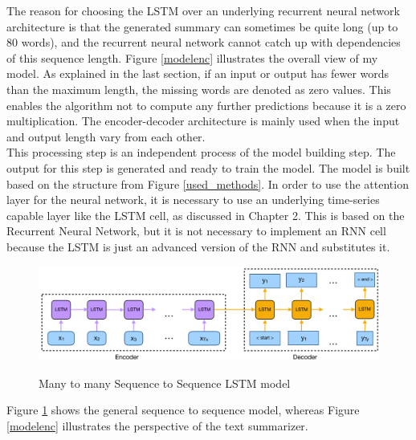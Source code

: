 The reason for choosing the LSTM over an underlying recurrent neural network architecture is that the generated summary can sometimes be quite long (up to 80 words), and the recurrent neural network cannot catch up with dependencies of this sequence length. Figure \ref{modelenc} illustrates the overall view of my model. 
As explained in the last section, if an input or output has fewer words than the maximum length, the missing words are denoted as zero values. This enables the algorithm not to compute any further predictions because it is a zero multiplication. The encoder-decoder architecture is mainly used when the input and output length vary from each other. \\

This processing step is an independent process of the model building step. The output for this step is generated and ready to train the model. 
The model is built based on the structure from Figure \ref{used_methods}. In order to use the attention layer for the neural network, it is necessary to use an underlying time-series capable layer like the LSTM cell, as discussed in Chapter 2. This is based on the Recurrent Neural Network, but it is not necessary to implement an RNN cell because the LSTM is just an advanced version of the RNN and substitutes it. 

\begin{figure}
	\begin{center}
		\includegraphics[width=6in]{photos/build-1}\\
		\caption{Many to many Sequence to Sequence LSTM model}\label{build_model}
	\end{center}
\end{figure}

Figure \ref{build_model} shows the general sequence to sequence model, whereas Figure \ref{modelenc} illustrates the perspective of the text summarizer. 

